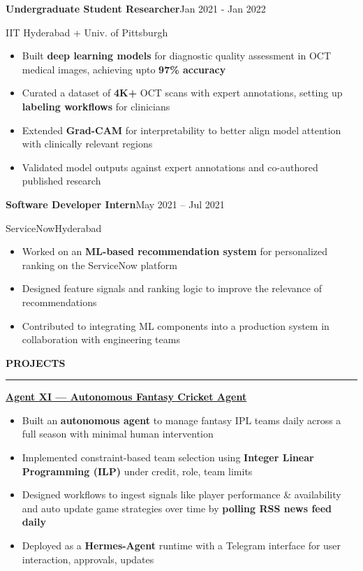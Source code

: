 \documentclass[10pt]{article}
\newcommand{\resumeSection}[1]{%
  \vspace{4pt plus 6pt}%
  \textbf{#1}\par
  \vspace{-5pt}%
  \rule{\linewidth}{0.3pt}\par
  \vspace{0pt}%
}
\newcommand{\resumeRole}[4]{%
  \textbf{#1}\hfill #2\par
  #3\hfill #4\par
}
\newcommand{\kw}[1]{\textbf{#1}}
\begin{document}
\vspace{0pt}
\resumeRole{Undergraduate Student Researcher}{Jan 2021 - Jan 2022}{IIT Hyderabad + Univ. of Pittsburgh}{}
\begin{itemize}
  \item Built \kw{deep learning models} for diagnostic quality assessment in OCT medical images, achieving upto \kw{97\% accuracy}
  \item Curated a dataset of \kw{4K+} OCT scans with expert annotations, setting up \kw{labeling workflows} for clinicians
  \item Extended \kw{Grad-CAM} for interpretability to better align model attention with clinically relevant regions
  \item Validated model outputs against expert annotations and co-authored published research
\end{itemize}

\vspace{0pt}
\resumeRole{Software Developer Intern}{May 2021 -- Jul 2021}{ServiceNow}{Hyderabad}
\begin{itemize}
  \item Worked on an \kw{ML-based recommendation system} for personalized ranking on the ServiceNow platform
  \item Designed feature signals and ranking logic to improve the relevance of recommendations
  \item Contributed to integrating ML components into a production system in collaboration with engineering teams
\end{itemize}

\resumeSection{PROJECTS}
\textbf{\href{https://github.com/Surya291/AgentXI}{Agent XI --- Autonomous Fantasy Cricket Agent}}\par
\begin{itemize}
  \item Built an \kw{autonomous agent} to manage fantasy IPL teams daily across a full season with minimal human intervention
  \item Implemented constraint-based team selection using \kw{Integer Linear Programming (ILP)} under credit, role, team limits
  \item Designed workflows to ingest signals like player performance \& availability and auto update game strategies over time by \kw{polling RSS news feed daily}
  \item Deployed as a \kw{Hermes-Agent} runtime with a Telegram interface for user interaction, approvals, updates
\end{itemize}
\end{document}
